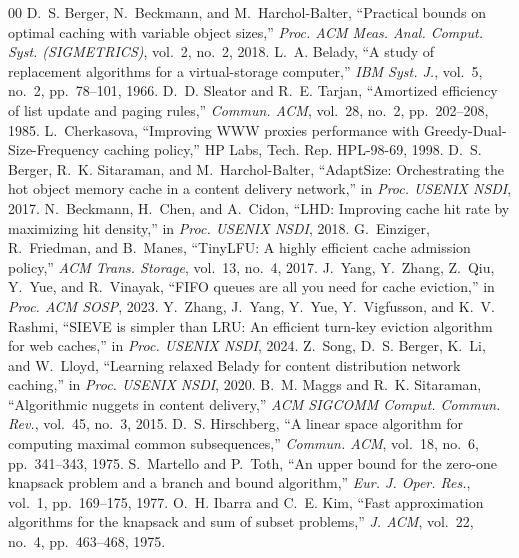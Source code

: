 \documentclass[conference]{IEEEtran}
\begin{document}
\begin{thebibliography}{00}
 D.~S. Berger, N.~Beckmann, and M.~Harchol-Balter, ``Practical bounds on optimal caching with variable
object sizes,'' \emph{Proc. ACM Meas. Anal. Comput. Syst. (SIGMETRICS)}, vol.~2, no.~2, 2018.
 L.~A. Belady, ``A study of replacement algorithms for a virtual-storage computer,'' \emph{IBM Syst.
J.}, vol.~5, no.~2, pp.~78--101, 1966.
 D.~D. Sleator and R.~E. Tarjan, ``Amortized efficiency of list update and paging rules,''
\emph{Commun. ACM}, vol.~28, no.~2, pp.~202--208, 1985.
 L.~Cherkasova, ``Improving WWW proxies performance with Greedy-Dual-Size-Frequency caching policy,''
HP Labs, Tech. Rep. HPL-98-69, 1998.
 D.~S. Berger, R.~K. Sitaraman, and M.~Harchol-Balter, ``AdaptSize: Orchestrating the hot object
memory cache in a content delivery network,'' in \emph{Proc. USENIX NSDI}, 2017.
 N.~Beckmann, H.~Chen, and A.~Cidon, ``LHD: Improving cache hit rate by maximizing hit density,'' in
\emph{Proc. USENIX NSDI}, 2018.
 G.~Einziger, R.~Friedman, and B.~Manes, ``TinyLFU: A highly efficient cache admission policy,''
\emph{ACM Trans. Storage}, vol.~13, no.~4, 2017.
 J.~Yang, Y.~Zhang, Z.~Qiu, Y.~Yue, and R.~Vinayak, ``FIFO queues are all you need for cache
eviction,'' in \emph{Proc. ACM SOSP}, 2023.
 Y.~Zhang, J.~Yang, Y.~Yue, Y.~Vigfusson, and K.~V. Rashmi, ``SIEVE is simpler than LRU: An efficient
turn-key eviction algorithm for web caches,'' in \emph{Proc. USENIX NSDI}, 2024.
 Z.~Song, D.~S. Berger, K.~Li, and W.~Lloyd, ``Learning relaxed Belady for content distribution network
caching,'' in \emph{Proc. USENIX NSDI}, 2020.
 B.~M. Maggs and R.~K. Sitaraman, ``Algorithmic nuggets in content delivery,'' \emph{ACM SIGCOMM
Comput. Commun. Rev.}, vol.~45, no.~3, 2015.
 D.~S. Hirschberg, ``A linear space algorithm for computing maximal common subsequences,''
\emph{Commun. ACM}, vol.~18, no.~6, pp.~341--343, 1975.
 S.~Martello and P.~Toth, ``An upper bound for the zero-one knapsack problem and a branch and bound
algorithm,'' \emph{Eur. J. Oper. Res.}, vol.~1, pp.~169--175, 1977.
 O.~H. Ibarra and C.~E. Kim, ``Fast approximation algorithms for the knapsack and sum of subset
problems,'' \emph{J. ACM}, vol.~22, no.~4, pp.~463--468, 1975.
\end{thebibliography}
\end{document}
